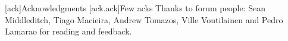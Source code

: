 [ack]{Acknowledgments}
[ack.ack]{Few acks}
Thanks to forum people: Sean Middleditch, Tiago Macieira, Andrew Tomazos, Ville Voutilainen and Pedro Lamarao for reading and feedback.